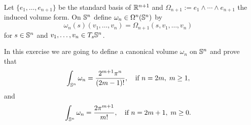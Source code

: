 \begin{exercise}
  Let $\{e_1,\ldots,e_{n+1}\}$ be the standard basis of $\mathbb{R}^{n+1}$ and $\Omega_{n+1} := e_1\wedge\cdots\wedge e_{n+1}$ the induced volume form.
  On $\mathbb{S}^n$ define $\omega_n\in\Omega^n(\mathbb{S}^n)$ by
  \begin{equation}
    \omega_n(s)(v_1, \ldots, v_n) = \Omega_{n+1}(s, v_1, \ldots, v_n)
  \end{equation}
  for $s\in\mathbb{S}^n$ and $v_1,\ldots,v_n\in T_s\mathbb{S}^n$.

  In this exercise we are going to define a canonical volume $\omega_n$ on $\mathbb{S}^n$ and prove that 
  \begin{equation}
    \int_{\mathbb{S}^n} \omega_n = \frac{2^{m+1}\pi^n}{(2m-1)!}, \quad\mbox{if } n=2m,\; m\geq 1,
  \end{equation}
  and
  \begin{equation}
    \int_{\mathbb{S}^n} \omega_n = \frac{2\pi^{m+1}}{m!}, \quad\mbox{if } n=2m+1,\; m\geq 0.
  \end{equation}


\end{exercise}
